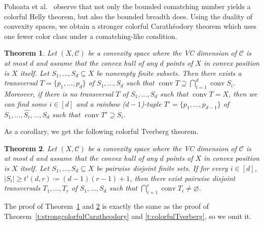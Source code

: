\documentclass[11pt]{article}
\newtheorem{thm}{Theorem}[section]%
\theoremstyle{definition}
\newcommand{\C}{\mathcal{C}}
\newcommand{\conv}{\operatorname{conv}}
\newcommand{\size}[1]{\left| #1 \right|}
\begin{document}
Pohoata et al.~\cite{pohoata2025colorful} observe that not only the bounded comatching number yields a colorful Helly theorem, but also the bounded breadth does.
Using the duality of convexity spaces, we obtain a stronger colorful Carath\'eodory theorem which uses one fewer color class under a comatching-like condition.
\begin{thm}\label{t:sharpstrongCC}
    Let $(X,\C)$ be a convexity space where the VC dimension of $\C$ is at most $d$ and assume that the convex hull of any $d$ points of $X$ in convex position is $X$ itself.
    Let $S_1, \ldots, S_d \subseteq X$ be nonempty finite subsets.
    Then there exists a transversal $T = \{p_1, \ldots, p_d\}$ of $S_1, \ldots, S_d$ such that $\conv T \supseteq \bigcap_{i=1}^d \conv S_i$.\\
    Moreover, if there is no transversal $T$ of $S_1, \ldots, S_d$ such that $\conv T = X$, then we can find some $i \in [d]$ and a rainbow ($d-1$)-tuple $T' = \{p_1, \ldots, p_{d-1}\}$ of $S_1, \ldots, \hat{S_i}, \ldots, S_d$ such that $\conv T' \supseteq S_i$.
\end{thm}

As a corollary, we get the following colorful Tverberg theorem.
\begin{thm}\label{t:sharpcolorfulTverberg}
    Let $(X,\C)$ be a convexity space where the VC dimension of $\C$ is at most $d$ and assume that the convex hull of any $d$ points of $X$ in convex position is $X$ itself.
    Let $S_1, \ldots, S_d \subseteq X$ be pairwise disjoint finite sets.
    If for every $i \in [d]$, $\size{S_i} \geq t'(d,r) \coloneqq (d-1)(r-1) + 1$, then there exist pairwise disjoint transversals $T_1, \ldots, T_r$ of $S_1, \ldots, S_d$ such that $\bigcap_{i = 1}^r \conv T_i \neq \varnothing$.
\end{thm}
The proof of Theorem~\ref{t:sharpstrongCC} and \ref{t:sharpcolorfulTverberg} is exactly the same as the proof of Theorem~\ref{t:strongcolorfulCaratheodory} and \ref{t:colorfulTverberg}, so we omit it.
\end{document}
